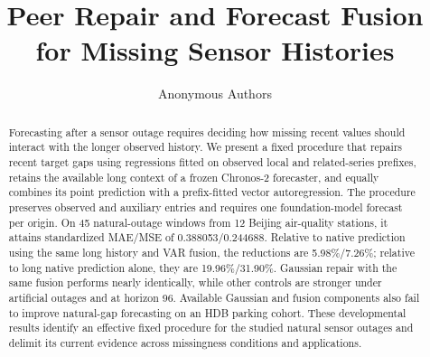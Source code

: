\documentclass{article}
\title{Peer Repair and Forecast Fusion\\for Missing Sensor Histories}
\author{Anonymous Authors}
\begin{document}
\maketitle
{}

\begin{abstract}
Forecasting after a sensor outage requires deciding how missing recent values should interact with the longer observed history. We present a fixed procedure that repairs recent target gaps using regressions fitted on observed local and related-series prefixes, retains the available long context of a frozen Chronos-2 forecaster, and equally combines its point prediction with a prefix-fitted vector autoregression. The procedure preserves observed and auxiliary entries and requires one foundation-model forecast per origin. On 45 natural-outage windows from 12 Beijing air-quality stations, it attains standardized MAE/MSE of 0.388053/0.244688. Relative to native prediction using the same long history and VAR fusion, the reductions are 5.98\%/7.26\%; relative to long native prediction alone, they are 19.96\%/31.90\%. Gaussian repair with the same fusion performs nearly identically, while other controls are stronger under artificial outages and at horizon 96. Available Gaussian and fusion components also fail to improve natural-gap forecasting on an HDB parking cohort. These developmental results identify an effective fixed procedure for the studied natural sensor outages and delimit its current evidence across missingness conditions and applications.
\end{abstract}








\clearpage
\appendix

\end{document}
